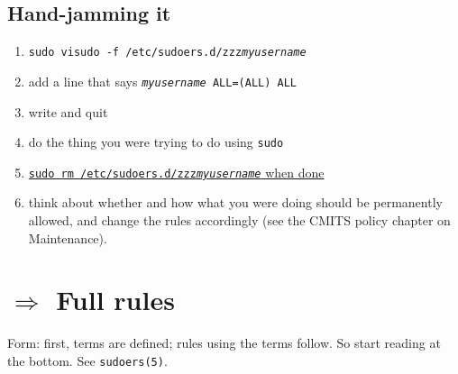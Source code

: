 \documentclass[12pt]{extarticle}
\begin{document}
\subsection{Hand-jamming it}

\begin{enumerate}
\item \texttt{sudo visudo -f /etc/sudoers.d/zzz\emph{myusername}}
\item add a line that says \texttt{\emph{myusername} ALL=(ALL) ALL}
\item write and quit
\item do the thing you were trying to do using \verb!sudo!
\item \underline{\texttt{sudo rm /etc/sudoers.d/zzz\emph{myusername}} when done}
\item think about whether and how what you were doing should be
  permanently allowed, and change the rules accordingly (see the CMITS
  policy chapter on Maintenance).
\end{enumerate}

\section*{{\huge $\Rightarrow$} Full rules}

Form: first, terms are defined; rules using the terms follow. So start
reading at the bottom. See \verb!sudoers(5)!.

\newpage

\end{document}
